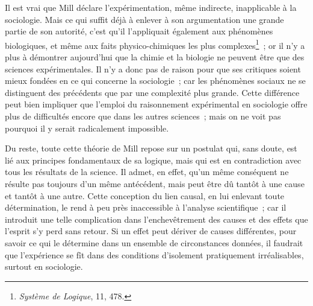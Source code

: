 \documentclass[french,twoside]{book} %
\begin{document}
Il est vrai que Mill déclare l’expérimentation, même indirecte, inapplicable à la sociologie. Mais ce qui suffit déjà à enlever à son argumentation une grande partie de son autorité, c’est qu’il l’appliquait également aux phénomènes biologiques, et même aux faits physico-chimiques les plus complexes\footnote{\emph{Système de Logique}, 11, 478.} ; or il n’y a plus à démontrer aujourd’hui que la chimie et la biologie ne peuvent être que des sciences expérimentales. Il n’y a donc pas de raison pour que ses critiques soient mieux fondées en ce qui concerne la sociologie ; car les phénomènes sociaux ne se distinguent des précédents que par une complexité plus grande. Cette différence peut bien impliquer que l’emploi du raisonnement expérimental en sociologie offre plus de difficultés encore que dans les autres sciences ; mais on ne voit pas pourquoi il y serait radicalement impossible.\par
Du reste, toute cette théorie de Mill repose sur un postulat qui, sans doute, est lié aux principes fondamentaux de sa logique, mais qui est en contradiction avec tous les résultats de la science. Il admet, en effet, qu’un même conséquent ne résulte pas toujours d’un même antécédent, mais peut être dû tantôt à une cause et tantôt à une autre. Cette conception du lien causal, en lui enlevant toute détermination, le rend à peu près inaccessible à l’analyse scientifique ; car il introduit une telle complication dans l’enchevêtrement des causes et des effets que l’esprit s’y perd sans retour. Si un effet peut dériver de causes différentes, pour savoir ce qui le détermine dans un ensemble de circonstances données, il faudrait que l’expérience se fît dans des conditions d’isolement pratiquement irréalisables, surtout en sociologie.\par
\end{document}
